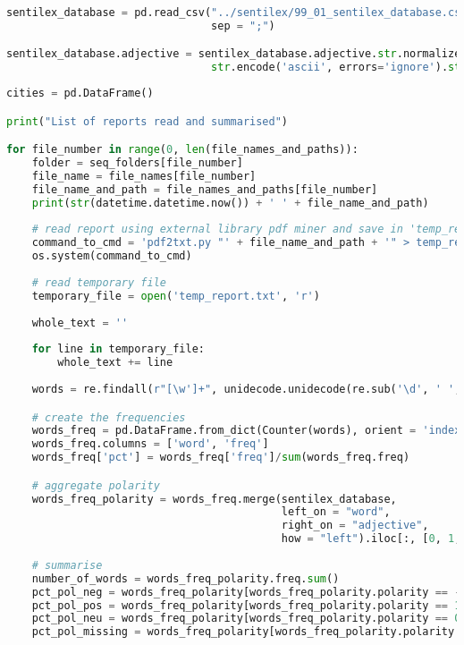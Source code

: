 \begin{lstlisting}[language=Python]
sentilex_database = pd.read_csv("../sentilex/99_01_sentilex_database.csv",
                                sep = ";")

sentilex_database.adjective = sentilex_database.adjective.str.normalize('NFKD').\
                                str.encode('ascii', errors='ignore').str.decode('utf-8')
\end{lstlisting}

\begin{lstlisting}[language=Python]
cities = pd.DataFrame()

print("List of reports read and summarised")

for file_number in range(0, len(file_names_and_paths)):
    folder = seq_folders[file_number]
    file_name = file_names[file_number]
    file_name_and_path = file_names_and_paths[file_number]
    print(str(datetime.datetime.now()) + ' ' + file_name_and_path)
    
    # read report using external library pdf miner and save in 'temp_report.txt'
    command_to_cmd = 'pdf2txt.py "' + file_name_and_path + '" > temp_report.txt'
    os.system(command_to_cmd)
    
    # read temporary file
    temporary_file = open('temp_report.txt', 'r')
    
    whole_text = ''
    
    for line in temporary_file:
        whole_text += line
    
    words = re.findall(r"[\w']+", unidecode.unidecode(re.sub('\d', ' ', whole_text).lower()))

    # create the frequencies
    words_freq = pd.DataFrame.from_dict(Counter(words), orient = 'index').reset_index()
    words_freq.columns = ['word', 'freq']
    words_freq['pct'] = words_freq['freq']/sum(words_freq.freq)

    # aggregate polarity
    words_freq_polarity = words_freq.merge(sentilex_database,
                                           left_on = "word",
                                           right_on = "adjective",
                                           how = "left").iloc[:, [0, 1, 2, 4]]
    
    # summarise
    number_of_words = words_freq_polarity.freq.sum()
    pct_pol_neg = words_freq_polarity[words_freq_polarity.polarity == -1].pct.sum()
    pct_pol_pos = words_freq_polarity[words_freq_polarity.polarity == 1].pct.sum()
    pct_pol_neu = words_freq_polarity[words_freq_polarity.polarity == 0].pct.sum()
    pct_pol_missing = words_freq_polarity[words_freq_polarity.polarity.isna()].pct.sum()


\end{lstlisting}
